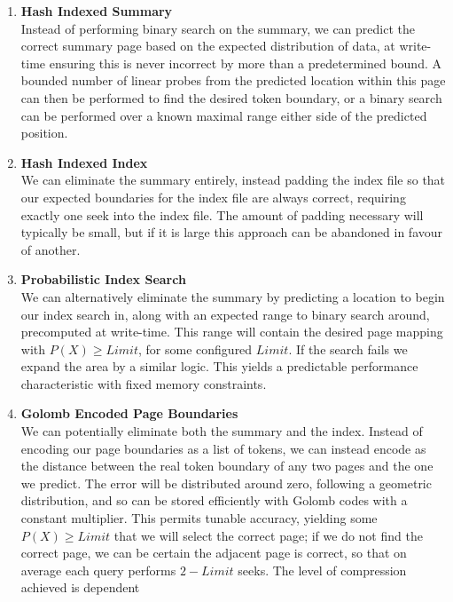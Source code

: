 \documentclass[fleqn]{article}
\begin{document}
    \begin{enumerate}
      \item{\textbf{Hash Indexed Summary}}\\[2pt]
        Instead of performing binary search on the summary, we can predict the correct summary page
        based on the expected distribution of data, at write-time ensuring this is never incorrect
        by more than a predetermined bound. A bounded number of linear probes from the predicted location
        within this page can then be performed to find the desired token boundary, or a binary search
        can be performed over a known maximal range either side of the predicted position.
      \item{\textbf{Hash Indexed Index}}\\[2pt]
        We can eliminate the summary entirely, instead padding the index file so that our expected boundaries 
        for the index file are always correct, requiring exactly one seek into the index file. The amount 
        of padding necessary will typically be small, but if it is large this approach can be abandoned
        in favour of another.
      \item{\textbf{Probabilistic Index Search}}\\[2pt]
        We can alternatively eliminate the summary by predicting a location to begin our index search in, 
        along with an expected range to binary search around, precomputed at write-time.
        This range will contain the desired page mapping with $P(X) \geq Limit$, for some configured $Limit$. 
        If the search fails we expand the area by a similar logic. This yields a predictable performance
        characteristic with fixed memory constraints.
      \item{\textbf{Golomb Encoded Page Boundaries}}\\[2pt]
        We can potentially eliminate both the summary and the index. Instead of encoding our page boundaries 
        as a list of tokens, we can instead encode as the distance between the real token boundary of any
        two pages and the one we predict. The error will be distributed around zero, following a geometric
        distribution, and so can be stored efficiently with Golomb codes with a constant multiplier. 
        This permits tunable accuracy, yielding some $P(X) \geq Limit$ that we will select
        the correct page; if we do not find the correct page, we can be certain the adjacent page is correct,
        so that on average each query performs $2-Limit$ seeks. The level of compression achieved is dependent

\end{enumerate}
\end{document}

